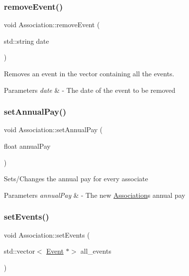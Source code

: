\subsubsection{\texorpdfstring{remove\+Event()}{removeEvent()}}
{\footnotesize\ttfamily void Association\+::remove\+Event (\begin{DoxyParamCaption}\item[{std\+::string}]{date }\end{DoxyParamCaption})}



Removes an event in the vector containing all the events. 


\begin{DoxyParams}{Parameters}
{\em date} & -\/ The date of the event to be removed \\
\hline
\end{DoxyParams}
\mbox{\label{classAssociation_a4279bd391a3110e4110d3f300b3423a3}} 
\subsubsection{\texorpdfstring{set\+Annual\+Pay()}{setAnnualPay()}}
{\footnotesize\ttfamily void Association\+::set\+Annual\+Pay (\begin{DoxyParamCaption}\item[{float}]{annual\+Pay }\end{DoxyParamCaption})}

Sets/\+Changes the annual pay for every associate


\begin{DoxyParams}{Parameters}
{\em annual\+Pay} & -\/ The new \hyperlink{classAssociation}{Association}\textquotesingle{}s annual pay \\
\hline
\end{DoxyParams}
\mbox{\label{classAssociation_a5611bc364e24e70f110332d1b2c63a08}} 
\subsubsection{\texorpdfstring{set\+Events()}{setEvents()}}
{\footnotesize\ttfamily void Association\+::set\+Events (\begin{DoxyParamCaption}\item[{std\+::vector$<$ \hyperlink{classEvent}{Event} $\ast$$>$}]{all\+\_\+events }\end{DoxyParamCaption})}

